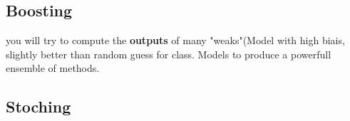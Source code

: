 \subsection{Boosting}
you will try to compute the \textbf{outputs} of many "weaks"\textcolor{ae}{(Model with high biais, slightly better than random guess for class}. Models to produce a powerfull ensemble of methods.
\subsection{Stoching}